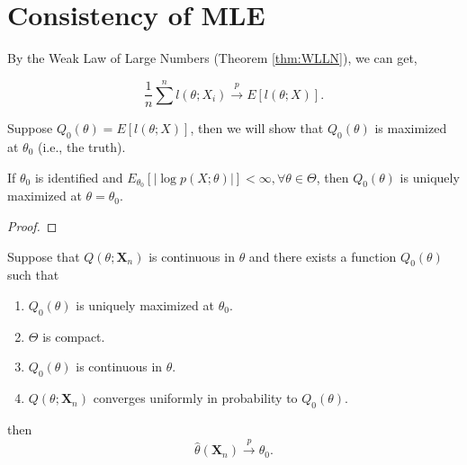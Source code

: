 \section{Consistency of MLE}

By the Weak Law of Large Numbers (Theorem \ref{thm:WLLN}), we can get,

\begin{equation}
    \frac{1}{n}\sum^{n}l\left(\theta;X_{i}\right)\stackrel{p}{\rightarrow}E\left[l(\theta;X)\right].
\end{equation}

Suppose $Q_{0}(\theta)=E\left[l(\theta;X)\right]$, then we will show that $Q_{0}(\theta)$ is maximized at $\theta_{0}$ (i.e., the truth).

\begin{lemma}
    If $\theta_{0}$ is identified and $E_{\theta_{0}}\left[|\log p(X;\theta)|\right]<\infty,\forall\theta\in\Theta$, then $Q_{0}(\theta)$ is uniquely maximized at $\theta=\theta_{0}$.
\end{lemma}

\begin{proof}

\end{proof}

\begin{theorem}
    Suppose that $Q\left(\theta;\textbf{X}_{n}\right)$ is continuous in $\theta$ and there exists a function $Q_{0}(\theta)$ such that
    \begin{enumerate}
        \item $Q_{0}(\theta)$ is uniquely maximized at $\theta_{0}$.
        \item $\Theta$ is compact.
        \item $Q_{0}(\theta)$ is continuous in $\theta$.
        \item $Q\left(\theta;\textbf{X}_{n}\right)$ converges uniformly in probability to $Q_{0}(\theta)$.
    \end{enumerate}
    then
    \begin{equation}
        \hat{\theta}\left(\textbf{X}_{n}\right)\stackrel{p}{\rightarrow}\theta_{0}.
    \end{equation}
\end{theorem}

